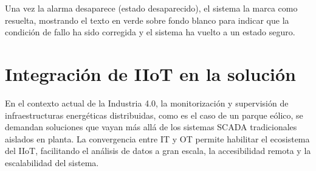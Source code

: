 Una vez la alarma desaparece (estado desaparecido), el sistema la marca como resuelta, mostrando el texto en verde sobre fondo blanco para indicar que la condición de fallo ha sido corregida y el sistema ha vuelto a un estado seguro.
\begin{table}[tb]
    \centering
    \caption{Matriz de codificación cromática y comportamiento de alarmas para el nodo WALM (IEC 60073).}
    \label{tab:matriz_alarmas_wincc}
\end{table}
\section{Integración de IIoT en la solución}

En el contexto actual de la Industria 4.0, la monitorización y supervisión de infraestructuras energéticas distribuidas, como es el caso de un parque eólico, se demandan soluciones que vayan más allá de los sistemas \ac{SCADA} tradicionales aislados en planta. La convergencia entre \ac{IT} y \ac{OT} permite habilitar el ecosistema del \ac{IIoT}, facilitando el análisis de datos a gran escala, la accesibilidad remota y la escalabilidad del sistema.\par

